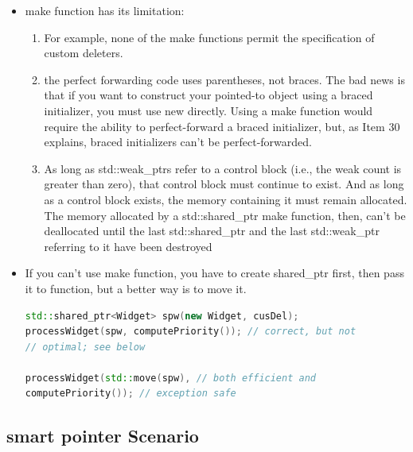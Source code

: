 \documentclass[a4paper,12pt,twoside]{book}
\begin{document}
\begin{itemize}
\begin{enumerate}
\end{enumerate}

\item make function has its limitation:
\begin{enumerate}
\item For example, none of the make functions permit the specification of custom deleters.

\item the perfect forwarding code uses parentheses, not braces. The bad news is that if you want to construct your pointed-to object using a braced initializer, you must use new directly. Using a make function would require the ability to perfect-forward a braced initializer, but, as Item 30 explains, braced initializers can't be perfect-forwarded.

\item As long as std::weak\_ptrs refer to a control block (i.e., the weak count is greater than zero), that control block must continue to exist. And as long as a control block
exists, the memory containing it must remain allocated. The memory allocated by a std::shared\_ptr make function, then, can't be deallocated until the last std::shared\_ptr and the last std::weak\_ptr referring to it have been destroyed
\end{enumerate}

\item If you can't use make function, you have to create shared\_ptr first, then pass it to function, but a better way is to move it.
\begin{lstlisting}[frame=single, language=c++]
std::shared_ptr<Widget> spw(new Widget, cusDel);
processWidget(spw, computePriority()); // correct, but not
// optimal; see below

processWidget(std::move(spw), // both efficient and
computePriority()); // exception safe
\end{lstlisting}

\end{itemize}


\subsection{smart pointer Scenario}
\end{document}
